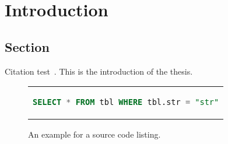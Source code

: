 \chapter{Introduction}\label{chapter:introduction}

\section{Section}
Citation test~\parencite{latex}.
This is the introduction of the thesis.

\lipsum[1]


\begin{figure}[htpb]
    \centering
    \begin{tabular}{c}
    \begin{lstlisting}[language=SQL]
      SELECT * FROM tbl WHERE tbl.str = "str"
    \end{lstlisting}
    \end{tabular}
    \caption[Example listing]{An example for a source code listing.}\label{fig:sample-listing}
  \end{figure}